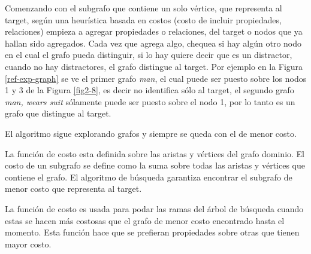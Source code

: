 Comenzando con el subgrafo que contiene un solo v\'ertice, que representa al target, seg\'un una heur\'{i}stica basada en costos (costo de incluir propiedades, relaciones) empieza a agregar propiedades o relaciones, del target o nodos que ya hallan sido agregados. Cada vez que agrega algo, chequea si hay alg\'un otro nodo en el cual el grafo pueda distinguir, si lo hay quiere decir que es un distractor, cuando no hay distractores, el grafo distingue al target. Por ejemplo en la Figura \ref{ref-exp-graph} se ve el primer grafo {\it man}, el cual puede ser puesto sobre los nodos 1 y 3 de la Figura \ref{fig2-8}, es decir no identifica s\'olo al target, el segundo grafo {\it man, wears suit} s\'olamente puede ser puesto sobre el nodo 1, por lo tanto es un grafo que distingue al target.  

El algoritmo sigue explorando grafos y siempre se queda con el de menor costo.

La funci\'on de costo esta definida sobre las aristas y v\'ertices del grafo dominio. El costo de un subgrafo se define como la suma sobre todas las aristas y v\'ertices que contiene el grafo.
El algoritmo de b\'usqueda garantiza encontrar el subgrafo de menor costo que representa al target.

La funci\'on de costo es usada para podar las ramas del \'arbol de b\'usqueda cuando estas se hacen m\'as costosas que el grafo de menor costo encontrado hasta el momento. Esta funci\'on hace que se prefieran propiedades sobre otras que tienen mayor costo.

